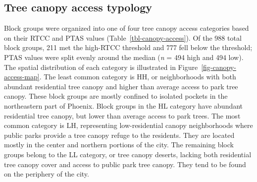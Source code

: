 \documentclass[
  sn-basic,
]{sn-jnl}
\begin{document}
\subsection{Tree canopy access typology}\label{sec-res-demographic}

Block groups were organized into one of four tree canopy access
categories based on their RTCC and PTAS values
(Table~\ref{tbl-canopy-access}). Of the 988 total block groups, 211 met
the high-RTCC threshold and 777 fell below the threshold; PTAS values
were split evenly around the median (\emph{n} = 494 high and 494 low).
The spatial distribution of each category is illustrated in
Figure~\ref{fig-canopy-access-map}. The least common category is HH, or
neighborhoods with both abundant residential tree canopy and higher than
average access to park tree canopy. These block groups are mostly
confined to isolated pockets in the northeastern part of Phoenix. Block
groups in the HL category have abundant residential tree canopy, but
lower than average access to park trees. The most common category is LH,
representing low-residential canopy neighborhoods where public parks
provide a tree canopy refuge to the residents. They are located mostly
in the center and northern portions of the city. The remaining block
groups belong to the LL category, or tree canopy deserts, lacking both
residential tree canopy cover and access to public park tree canopy.
They tend to be found on the periphery of the city.

\begin{table}

\caption{\label{tbl-canopy-access}Tree canopy access categories}


\end{table}%
\end{document}
